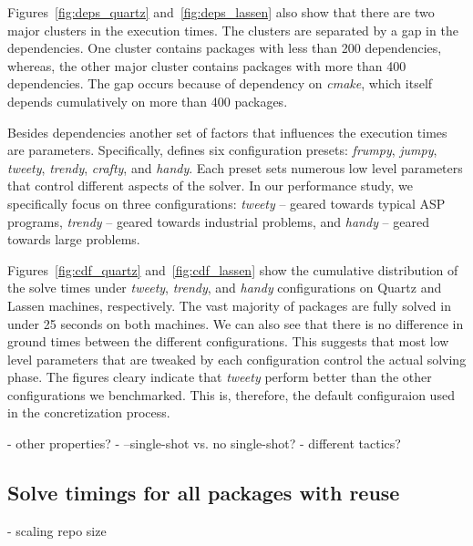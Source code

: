 Figures~\ref{fig:deps_quartz} and~\ref{fig:deps_lassen} also show that there are two major clusters in the execution times. The clusters are separated by a gap in the dependencies. One cluster contains packages with less than 200 dependencies, whereas, the other major cluster contains packages with more than 400 dependencies. The gap occurs because of dependency on \emph{cmake}, which itself depends cumulatively on more than 400 packages.

Besides dependencies another set of factors that influences the execution times are \clingo{} parameters. Specifically, \clingo{} defines six configuration presets: \emph{frumpy}, \emph{jumpy}, \emph{tweety}, \emph{trendy}, \emph{crafty}, and \emph{handy}. Each preset sets numerous low level parameters that control different aspects of the solver. In our performance study, we specifically focus on three configurations: \emph{tweety} -- geared towards typical ASP programs, \emph{trendy} -- geared towards industrial problems, and \emph{handy} -- geared towards large problems.





Figures~\ref{fig:cdf_quartz} and~\ref{fig:cdf_lassen} show the cumulative distribution of the solve times under \emph{tweety}, \emph{trendy}, and \emph{handy} configurations on Quartz and Lassen machines, respectively. The vast majority of packages are fully solved in under 25 seconds on both machines. We can also see that there is no difference in ground times between the different configurations. This suggests that most low level parameters that are tweaked by each configuration control the actual solving phase. The figures cleary indicate that \emph{tweety} perform better than the other configurations we benchmarked. This is, therefore, the default configuraion used in the concretization process. 

- other properties?
- --single-shot vs. no single-shot?
- different tactics?

\subsection{Solve timings for all packages with reuse}
- scaling repo size






